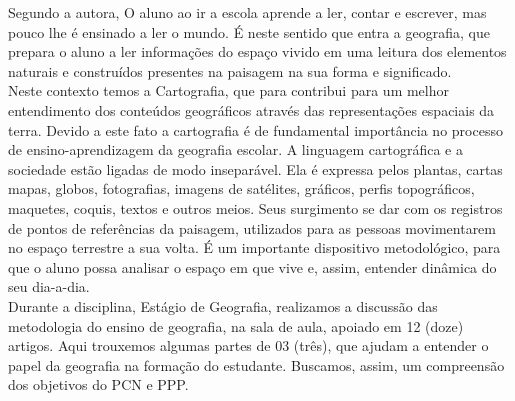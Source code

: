 Segundo a autora, O aluno ao ir a escola aprende a ler, contar e escrever, mas pouco lhe é ensinado a ler o mundo. É neste sentido que entra a geografia, que prepara o aluno a ler informações do espaço vivido em uma leitura dos elementos naturais e construídos presentes na paisagem na sua forma e significado.\\

Neste contexto temos a Cartografia, que para \cite{lima2012linguagem} contribui para um melhor entendimento dos conteúdos geográficos através das representações espaciais da terra. Devido a este fato a cartografia é de fundamental importância no processo de ensino-aprendizagem da geografia escolar. A linguagem cartográfica e a sociedade estão ligadas de modo inseparável. Ela é expressa pelos plantas, cartas mapas, globos, fotografias, imagens de satélites, gráficos, perfis topográficos, maquetes, coquis, textos e outros meios. Seus surgimento se dar com os registros de pontos de referências da paisagem, utilizados para as pessoas movimentarem no espaço terrestre a sua volta. É um importante dispositivo metodológico, para que o aluno possa analisar o espaço em que vive e, assim, entender dinâmica do seu dia-a-dia.\\

Durante a disciplina, Estágio de Geografia, realizamos a discussão das metodologia do ensino de geografia, na sala de aula, apoiado em 12 (doze) artigos. Aqui trouxemos algumas partes de 03 (três), que ajudam a entender o papel da geografia na formação do estudante. Buscamos, assim, um compreensão dos objetivos do PCN e PPP.